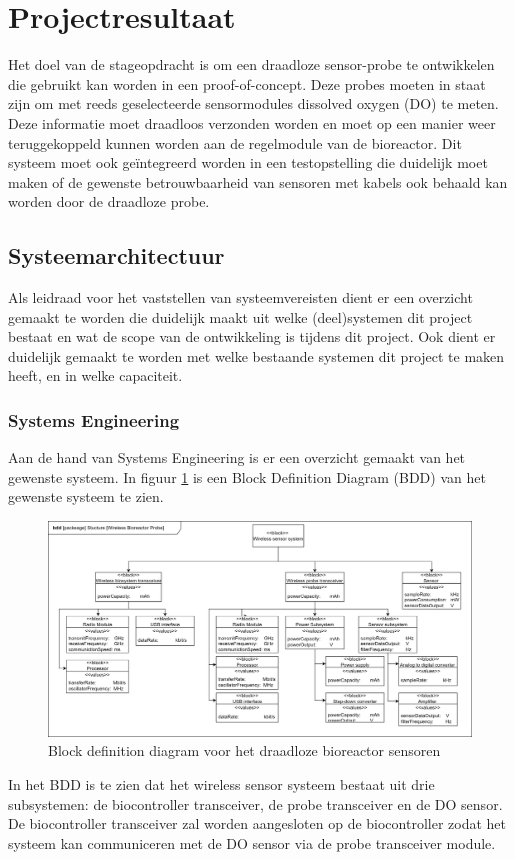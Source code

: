 \section{Projectresultaat}
Het doel van de stageopdracht is om een draadloze sensor-probe te ontwikkelen die gebruikt kan worden in een proof-of-concept. Deze probes moeten in staat zijn om met reeds geselecteerde sensormodules dissolved oxygen (DO) te meten. Deze informatie moet draadloos verzonden worden en moet op een manier weer teruggekoppeld kunnen worden aan de regelmodule van de bioreactor. Dit systeem moet ook geïntegreerd worden in een testopstelling die duidelijk moet maken of de gewenste betrouwbaarheid van sensoren met kabels ook behaald kan worden door de draadloze probe.

\subsection{Systeemarchitectuur}
Als leidraad voor het vaststellen van systeemvereisten dient er een overzicht gemaakt te worden die duidelijk maakt uit welke (deel)systemen dit project bestaat en wat de scope van de ontwikkeling is tijdens dit project. Ook dient er duidelijk gemaakt te worden met welke bestaande systemen dit project te maken heeft, en in welke capaciteit.

\subsubsection{Systems Engineering}
Aan de hand van Systems Engineering is er een overzicht gemaakt van het gewenste systeem. In figuur \ref{fig:sensor_bdd} is een Block Definition Diagram (BDD) van het gewenste systeem te zien.

\begin{figure}[H]
	\centering
	\includegraphics[width=1.0\linewidth]{graphics/sensor_bdd}
	\caption{Block definition diagram voor het draadloze bioreactor sensoren}
	\label{fig:sensor_bdd}
\end{figure}
In het BDD is te zien dat het wireless sensor systeem bestaat uit drie subsystemen: de biocontroller transceiver, de probe transceiver en de DO sensor. De biocontroller transceiver zal worden aangesloten op de biocontroller zodat het systeem kan communiceren met de DO sensor via de probe transceiver module. 

